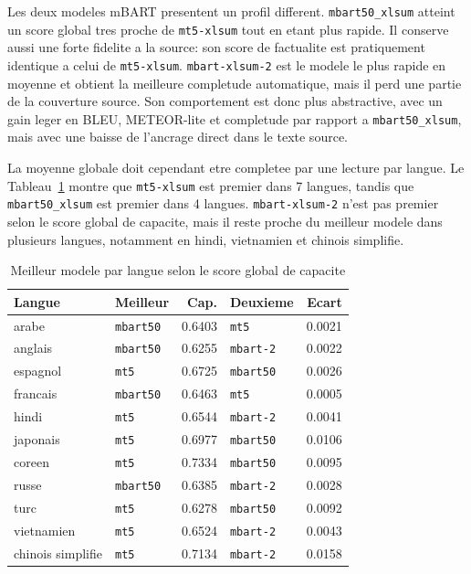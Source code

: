 Les deux modeles mBART presentent un profil different. \texttt{mbart50\_\allowbreak xlsum} atteint un score global tres proche de \texttt{mt5-\allowbreak xlsum} tout en etant plus rapide. Il conserve aussi une forte fidelite a la source: son score de factualite est pratiquement identique a celui de \texttt{mt5-\allowbreak xlsum}. \texttt{mbart-\allowbreak xlsum-2} est le modele le plus rapide en moyenne et obtient la meilleure completude automatique, mais il perd une partie de la couverture source. Son comportement est donc plus abstractive, avec un gain leger en BLEU, METEOR-lite et completude par rapport a \texttt{mbart50\_\allowbreak xlsum}, mais avec une baisse de l'ancrage direct dans le texte source.

La moyenne globale doit cependant etre completee par une lecture par langue. Le Tableau~\ref{tab:analyse-language-winners} montre que \texttt{mt5-\allowbreak xlsum} est premier dans 7 langues, tandis que \texttt{mbart50\_\allowbreak xlsum} est premier dans 4 langues. \texttt{mbart-\allowbreak xlsum-2} n'est pas premier selon le score global de capacite, mais il reste proche du meilleur modele dans plusieurs langues, notamment en hindi, vietnamien et chinois simplifie.

\begin{table}[t]
\caption{Meilleur modele par langue selon le score global de capacite}
\label{tab:analyse-language-winners}
\centering
\begin{tabular}{|l|l|r|l|r|}
\hline
\textbf{Langue} & \textbf{Meilleur} & \textbf{Cap.} & \textbf{Deuxieme} & \textbf{Ecart} \\
\hline
arabe & \texttt{mbart50} & 0.6403 & \texttt{mt5} & 0.0021 \\
\hline
anglais & \texttt{mbart50} & 0.6255 & \texttt{mbart-2} & 0.0022 \\
\hline
espagnol & \texttt{mt5} & 0.6725 & \texttt{mbart50} & 0.0026 \\
\hline
francais & \texttt{mbart50} & 0.6463 & \texttt{mt5} & 0.0005 \\
\hline
hindi & \texttt{mt5} & 0.6544 & \texttt{mbart-2} & 0.0041 \\
\hline
japonais & \texttt{mt5} & 0.6977 & \texttt{mbart50} & 0.0106 \\
\hline
coreen & \texttt{mt5} & 0.7334 & \texttt{mbart50} & 0.0095 \\
\hline
russe & \texttt{mbart50} & 0.6385 & \texttt{mbart-2} & 0.0028 \\
\hline
turc & \texttt{mt5} & 0.6278 & \texttt{mbart50} & 0.0092 \\
\hline
vietnamien & \texttt{mt5} & 0.6524 & \texttt{mbart-2} & 0.0043 \\
\hline
chinois simplifie & \texttt{mt5} & 0.7134 & \texttt{mbart-2} & 0.0158 \\
\hline
\end{tabular}
\end{table}

